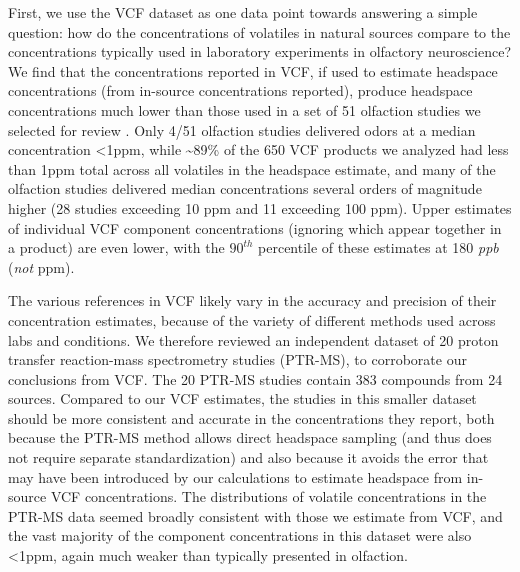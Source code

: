 \documentclass[12pt]{caltech_thesis}
\renewcommand{\cite}{{ }\autocite}
\begin{document}
\begin{refsection}
First, we use the VCF dataset as one data point towards answering a simple question: how do the concentrations of volatiles in natural sources compare to the concentrations typically used in laboratory experiments in olfactory neuroscience?
We find that the concentrations reported in VCF, if used to estimate headspace concentrations (from in-source concentrations reported), produce headspace concentrations much lower than those used in a set of 51 olfaction studies we selected for review\cite{ConcentrationReview}.
Only 4/51 olfaction studies delivered odors at a median concentration <1ppm, while \textasciitilde89\% of the 650 VCF products we analyzed had less than 1ppm total across all volatiles in the headspace estimate, and many of the olfaction studies delivered median concentrations several orders of magnitude higher (28 studies exceeding 10 ppm and 11 exceeding 100 ppm).
Upper estimates of individual VCF component concentrations (ignoring which appear together in a product) are even lower, with the $90^{th}$ percentile of these estimates at 180 \textit{ppb} (\textit{not} ppm).

The various references in VCF likely vary in the accuracy and precision of their concentration estimates, because of the variety of different methods used across labs and conditions.
We therefore reviewed an independent dataset of 20 proton transfer reaction-mass spectrometry studies (PTR-MS), to corroborate our conclusions from VCF.
The 20 PTR-MS studies contain 383 compounds from 24 sources.
Compared to our VCF estimates, the studies in this smaller dataset should be more consistent and accurate in the concentrations they report, both because the PTR-MS method allows direct headspace sampling (and thus does not require separate standardization)\cite{Lindinger2005} and also because it avoids the error that may have been introduced by our calculations to estimate headspace from in-source VCF concentrations.
The distributions of volatile concentrations in the PTR-MS data seemed broadly consistent with those we estimate from VCF, and the vast majority of the component concentrations in this dataset were also <1ppm, again much weaker than typically presented in olfaction.


\end{refsection}
\end{document}
